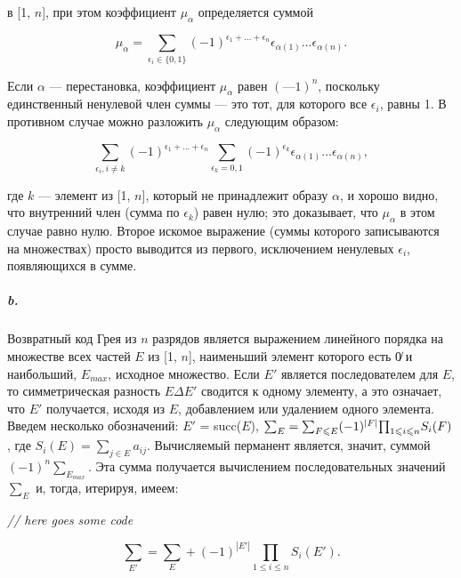 \documentclass{../../template/mai_book}
\DeclarePairedDelimiter{\abs}{\lvert}{\rvert}
\begin{document}

\noindent
[1, $n$] в [1, $n$], при этом коэффициент $\mu_\alpha$ определяется суммой

\begin{equation*}
\mu_{\alpha} = \sum_{\epsilon_i\in\{0,1\}} (-1)^{\epsilon_1+...+\epsilon_n} \epsilon_{\alpha(1)}...\epsilon_{\alpha(n)}.
\end{equation*}

\noindent
Если $\alpha$ — перестановка, коэффициент $\mu_\alpha$ равен $(—1)^n$, поскольку единственный ненулевой член суммы — это тот, для которого все $\epsilon_i$, равны 1. В противном случае можно разложить $\mu_\alpha$ следующим образом:

\begin{equation*}
\sum_{\epsilon_i, i \neq k} (-1)^{\epsilon_1+...+\epsilon_n} \sum_{\epsilon_k=0,1} (-1)^{\epsilon_k} \epsilon_{\alpha(1)}...\epsilon_{\alpha(n)},
\end{equation*}

\noindent
где $k$ — элемент из [1, $n$], который не принадлежит образу $\alpha$, и хорошо видно, что внутренний член (сумма по $\epsilon_k$) равен нулю; это доказывает, что $\mu_\alpha$ в этом случае равно нулю. Второе искомое выражение (суммы которого записываются на множествах) просто выводится из первого, исключением ненулевых $\epsilon_i$, появляющихся в сумме.

\subparagraph{b.} Возвратный код Грея из $n$ разрядов является выражением линейного порядка на множестве всех частей $E$ из [1, $n$], наименьший элемент которого есть 0̸  и наибольший, $E_{max}$, исходное множество. Если $E'$ является последователем для $E$, то симметрическая разность $E \Delta E'$ сводится к одному элементу, а это означает, что $E'$ получается, исходя из $E$, добавлением или удалением одного элемента. Введем несколько обозначений: \linebreak $E'$ = succ($E$), ${\sum}_E = {\sum}_{F \leqslant E} (-1)^{\abs{F}} {\prod}_{1 \leqslant i \leqslant n} S_i (F)$, где $S_i (E) = {\sum}_{j \in E} a_{ij}$. Вычисляемый перманент является, значит, суммой $(-1)^n {\sum}_{E_{max}}$. Эта сумма получается вычислением последовательных значений ${\sum}_E$ и, тогда, итерируя, имеем: \newline

\textit{// here goes some code}

\setcounter{equation}{6}

\begin{equation}
{\sum}_{E'} = {\sum}_E + (-1)^{|E'|} \prod_{1 \leqslant i \leqslant n} S_i(E').
\end{equation}
\end{document}
